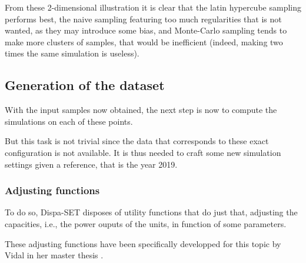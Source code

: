From these 2-dimensional illustration it is clear that the latin hypercube sampling performs best, the naive sampling featuring too much regularities that is not wanted, as they may introduce some bias, and Monte-Carlo sampling tends to make more clusters of samples, that would be inefficient (indeed, making two times the same simulation is useless).

\subsection{Generation of the dataset}

With the input samples now obtained, the next step is now to compute the simulations on each of these points.

But this task is not trivial since the data that corresponds to these exact configuration is not available. It is thus needed to craft some new simulation settings given a reference, that is the year 2019.

\subsubsection{Adjusting functions}
To do so, Dispa-SET disposes of utility functions that do just that, adjusting the capacities, i.e., the power ouputs of the units, in function of some parameters.

These adjusting functions have been specifically developped for this topic by Vidal in her master thesis \cite{carlas-thesis}.


